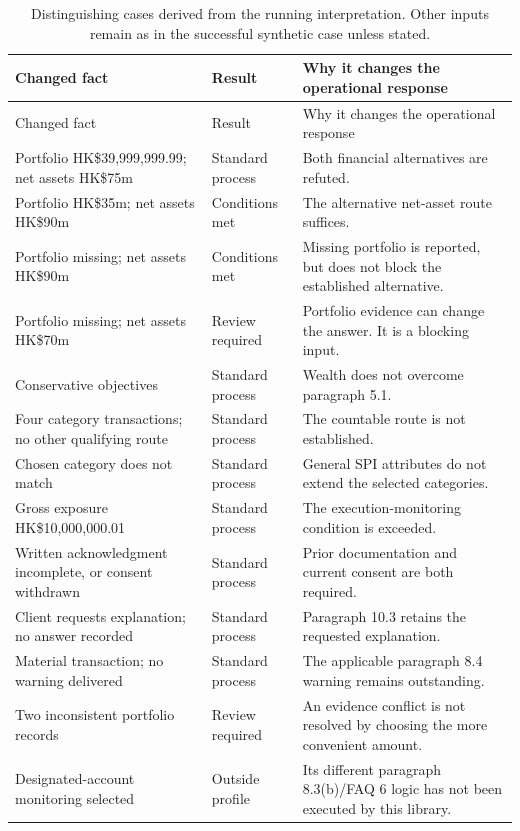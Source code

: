 \begingroup\small
\begin{longtable}{P{0.38\textwidth}P{0.19\textwidth}P{0.33\textwidth}}
\caption{Distinguishing cases derived from the running interpretation. Other
inputs remain as in the successful synthetic case unless stated.}\label{tab:dry-cases}\\
\toprule Changed fact & Result & Why it changes the operational response \\\midrule
\endfirsthead
\toprule Changed fact & Result & Why it changes the operational response \\\midrule
\endhead
Portfolio HK\$39,999,999.99; net assets HK\$75m & Standard process & Both financial alternatives are refuted.\\
Portfolio HK\$35m; net assets HK\$90m & Conditions met & The alternative net-asset route suffices.\\
Portfolio missing; net assets HK\$90m & Conditions met & Missing portfolio is reported, but does not block the established alternative.\\
Portfolio missing; net assets HK\$70m & Review required & Portfolio evidence can change the answer. It is a blocking input.\\
Conservative objectives & Standard process & Wealth does not overcome paragraph 5.1.\\
Four category transactions; no other qualifying route & Standard process & The countable route is not established.\\
Chosen category does not match & Standard process & General SPI attributes do not extend the selected categories.\\
Gross exposure HK\$10,000,000.01 & Standard process & The execution-monitoring condition is exceeded.\\
Written acknowledgment incomplete, or consent withdrawn & Standard process & Prior documentation and current consent are both required.\\
Client requests explanation; no answer recorded & Standard process & Paragraph 10.3 retains the requested explanation.\\
Material transaction; no warning delivered & Standard process & The applicable paragraph 8.4 warning remains outstanding.\\
Two inconsistent portfolio records & Review required & An evidence conflict is not resolved by choosing the more convenient amount.\\
Designated-account monitoring selected & Outside profile & Its different paragraph 8.3(b)/FAQ 6 logic has not been executed by this library.\\
\bottomrule
\end{longtable}
\endgroup

